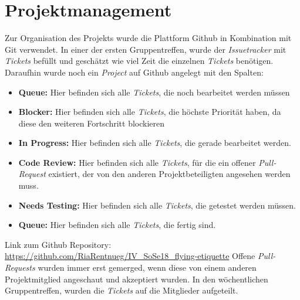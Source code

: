\documentclass{mi-seminar}
\begin{document}
\section{Projektmanagement}
Zur Organisation des Projekts wurde die Plattform Github in Kombination mit Git verwendet. In einer der ersten Gruppentreffen, wurde der \textit{Issuetracker} mit \textit{Tickets} befüllt und geschätzt wie viel Zeit die einzelnen \textit{Tickets} benötigen. 
Daraufhin wurde noch ein \textit{Project} auf Github angelegt mit den Spalten:
\begin{itemize}
\item \textbf{Queue: } Hier befinden sich alle \textit{Tickets}, die noch bearbeitet werden müssen
\item \textbf{Blocker: } Hier befinden sich alle \textit{Tickets}, die höchste Priorität haben, da diese den weiteren Fortschritt blockieren
\item \textbf{In Progress: } Hier befinden sich alle \textit{Tickets}, die gerade bearbeitet werden.
\item \textbf{Code Review: } Hier befinden sich alle \textit{Tickets}, für die ein offener \textit{Pull-Request} existiert, der von den anderen Projektbeteiligten angesehen werden muss.
\item \textbf{Needs Testing: } Hier befinden sich alle \textit{Tickets}, die getestet werden müssen.
\item \textbf{Queue: } Hier befinden sich alle \textit{Tickets}, die fertig sind.
\newline \newline
\end{itemize}
Link zum Github Repository:\newline
\href{https://github.com/RiaRentnueg/IV_SoSe18_flying-etiquette}{https://github.com/RiaRentnueg/IV\_SoSe18\_flying-etiquette}
\linebreak \newline
Offene \textit{Pull-Requests} wurden immer erst gemerged, wenn diese von einem anderen Projektmitglied angeschaut und akzeptiert wurden. 
In den wöchentlichen Gruppentreffen, wurden die \textit{Tickets}
auf die Mitglieder aufgeteilt.
\end{document}
